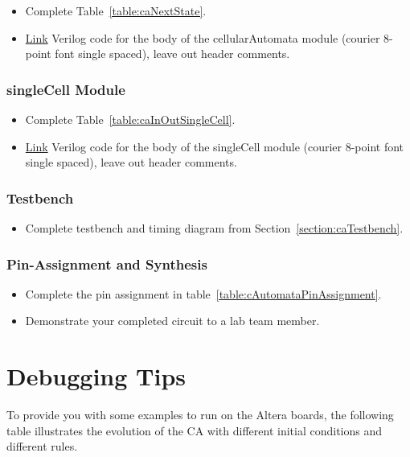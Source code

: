 \begin{itemize}
\item
Complete Table~\ref{table:caNextState}.
\item
\protect\hyperlink{cellularAutomata_verilog}{Link} Verilog code for
the body of the cellularAutomata module (courier 8-point font single
spaced), leave out header comments.
\end{itemize}

\subsubsection{singleCell Module}

\begin{itemize}
\item
Complete Table~\ref{table:caInOutSingleCell}.
\item
\protect\hyperlink{singleCell_verilog}{Link} Verilog code for the body
of the singleCell module (courier 8-point font single spaced), leave
out header comments.
\end{itemize}

\subsubsection{Testbench}
\begin{itemize}
\item Complete testbench and timing diagram from Section~\ref{section:caTestbench}.
\end{itemize}

\subsubsection{Pin-Assignment and Synthesis}
\begin{itemize}
\item Complete the pin assignment in table~\ref{table:cAutomataPinAssignment}.
\item Demonstrate your completed circuit to a lab team member.
\end{itemize}

\section{Debugging Tips}
\label{section:caDebugging}
To provide you with some examples to run on the Altera boards, the
following table illustrates the evolution of the CA with different
initial conditions and different rules.

